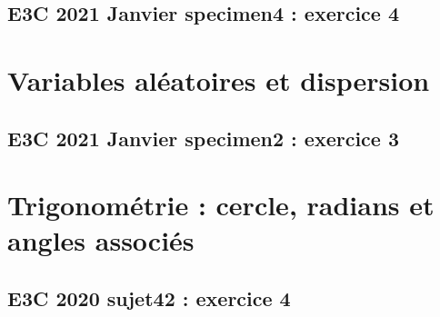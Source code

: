 \documentclass[lang=fr,edition=teacher,layout=sheet]{mxbook}
\begin{document}
\begingroup\endgroup
\par\bigskip
{}\subsection*{E3C 2021 Janvier specimen4 : exercice 4}
\begingroup\endgroup
\par\bigskip
\clearpage\section*{Variables aléatoires et dispersion}
\subsection*{E3C 2021 Janvier specimen2 : exercice 3}
\begingroup\endgroup
\par\bigskip
\clearpage\section*{Trigonométrie : cercle, radians et angles associés}
\subsection*{E3C 2020 sujet42 : exercice 4}
\begingroup\endgroup
\par\bigskip
\end{document}
